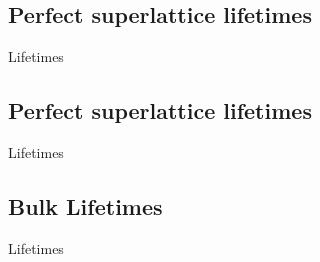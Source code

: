 \documentclass{beamer}
\begin{document}
\subsection{Perfect superlattice lifetimes}
\begin{frame}{Lifetimes}
\begin{figure}[!h]
\begin{center}
\vspace*{-0.8cm}
\hspace*{-1cm}
\renewcommand{\figure}{Fig.}
\label{fig:lifetimes}
\end{center}
\end{figure}
\end{frame}
\subsection{Perfect superlattice lifetimes}
\begin{frame}{Lifetimes}
\begin{figure}[!h]
\begin{center}
\vspace*{-0.8cm}
\hspace*{-1cm}
\renewcommand{\figure}{Fig.}
\label{fig:lifetimes}
\end{center}
\end{figure}
\end{frame}


\subsection{Bulk Lifetimes}
\begin{frame}{Lifetimes}
\begin{figure}[!h]
\begin{center}
\vspace*{-0.8cm}
\hspace*{-1cm}
\renewcommand{\figure}{Fig.}
\label{fig:lifetimes}
\end{center}
\end{figure}
\end{frame}

\end{document}
